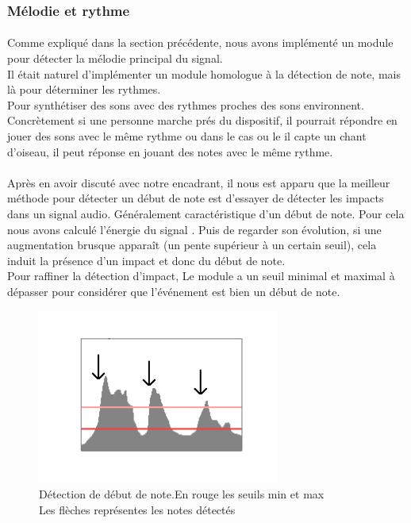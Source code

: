 \documentclass[a4paper, titlepage, oneside, 12pt]{article}%
\begin{document}
\subsubsection{Mélodie et rythme}
\paragraph{}
Comme expliqué dans la section précédente, nous avons implémenté un module pour détecter la mélodie principal du signal.\\

Il était naturel d'implémenter un module homologue à la détection de note, mais là pour déterminer les rythmes.\\
Pour synthétiser des sons avec des rythmes proches des sons environnent.\\
Concrètement si une personne marche prés du dispositif, il pourrait répondre en jouer des sons avec le même rythme ou dans le cas ou le il capte un chant d'oiseau, il peut réponse en jouant des notes avec le même rythme.\\

\paragraph{}
Après en avoir discuté avec notre encadrant, il nous est apparu que la meilleur méthode pour détecter un début de note est d’essayer de détecter les impacts dans un signal audio. Généralement caractéristique d'un début de note. Pour cela  nous avons calculé l’énergie du signal %
. Puis de regarder son évolution, si une augmentation brusque apparaît (un pente supérieur à un certain seuil), cela induit la présence d'un impact et donc du début de note.\\
Pour raffiner la détection d'impact, Le module a un seuil minimal et maximal à dépasser pour considérer que l’événement est bien un début de note.
\begin{figure}[H]
	\centering
	\includegraphics[width=300px]{bonk.jpg}
	\caption{Détection de début de note.En rouge les seuils min et max\\Les flèches  représentes les notes détectés}
\end{figure}
 
\end{document}

